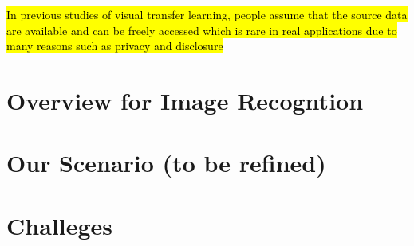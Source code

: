 \hl{
In previous studies of visual transfer learning, people assume that the source data are available and can be freely accessed which is rare in real applications due to many reasons such as privacy and disclosure} 


\section{Overview for Image Recogntion}\label{sec:intro:over}

\section{Our Scenario (to be refined)}

\section{Challeges}
